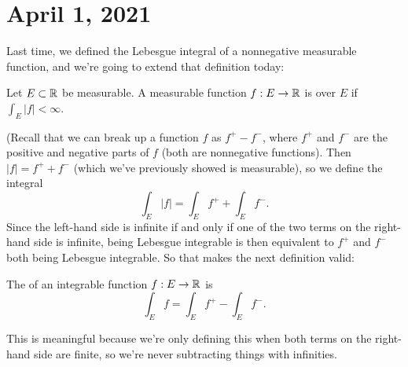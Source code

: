 \pagebreak\section*{April 1, 2021}

Last time, we defined the Lebesgue integral of a nonnegative measurable function, and we're going to extend that definition today:

\begin{definition}
Let $E \subset \mathbb R$ be measurable. A measurable function $f: E \to \mathbb R$ is  over $E$ if $\int_E |f| < \infty$.
\end{definition}

(Recall that we can break up a function $f$ as $f^+ - f^-$, where $f^+$ and $f^-$ are the positive and negative parts of $f$ (both are nonnegative functions). Then $|f| = f^+ + f^-$ (which we've previously showed is measurable), so we define the integral
\[
    \int_E |f| = \int_E f^+ + \int_E f^-. 
\]
Since the left-hand side is infinite if and only if one of the two terms on the right-hand side is infinite, being Lebesgue integrable is then equivalent to $f^+$ and $f^-$ both being Lebesgue integrable. So that makes the next definition valid:

\begin{definition}
The  of an integrable function $f: E \to \mathbb R$ is 
\[
    \int_E f = \int_E f^+ - \int_E f^-.
\]
\end{definition}

This is meaningful because we're only defining this when both terms on the right-hand side are finite, so we're never subtracting things with infinities. 

